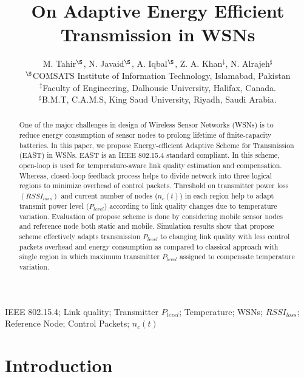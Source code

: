 \documentclass[12pt, conference, compsocconf, onecolumn, draftcls]{IEEEtran}
\begin{document}
\title{On Adaptive Energy Efficient\\ Transmission in WSNs}

\author{M. Tahir{$^\S$}, N. Javaid{$^\S$}, A. Iqbal{$^\S$}, Z. A. Khan$^\ddag$, N. Alrajeh$^{\sharp}$\\
{$^\S$}COMSATS Institute of Information Technology, Islamabad, Pakistan\\
$^\ddag$Faculty of Engineering, Dalhousie University, Halifax, Canada.\\
$^{\sharp}$B.M.T, C.A.M.S, King Saud University, Riyadh, Saudi Arabia.\\}

\maketitle
\IEEEpeerreviewmaketitle

\begin{abstract}
One of the major challenges in design of Wireless Sensor Networks (WSNs) is to reduce energy consumption of sensor nodes to prolong lifetime of finite-capacity batteries. In this paper, we propose Energy-efficient Adaptive Scheme for Transmission (EAST) in WSNs. EAST is an IEEE 802.15.4 standard compliant. In this scheme, open-loop is used for temperature-aware link quality estimation and compensation. Whereas, closed-loop feedback process helps to divide network into three logical regions to minimize overhead of control packets. Threshold on transmitter power loss $(RSSI_{loss})$ and current number of nodes ($n_{c}(t)$) in each region help to adapt transmit power level ($P_{level}$) according to link quality changes due to temperature variation. Evaluation of propose scheme is done by considering  mobile sensor nodes and reference node both static and mobile. Simulation results show that propose scheme effectively adapts transmission $P_{level}$ to changing link quality with less control packets overhead and energy consumption as compared to classical approach with single region in which maximum transmitter $P_{level}$ assigned to compensate temperature variation.
\end{abstract}

\begin{keywords}
IEEE 802.15.4; Link quality; Transmitter $P_{level}$; Temperature; WSNs; $RSSI_{loss}$; Reference Node; Control Packets; $n_{c}(t)$
\end{keywords}

\section{Introduction}
\end{document}
